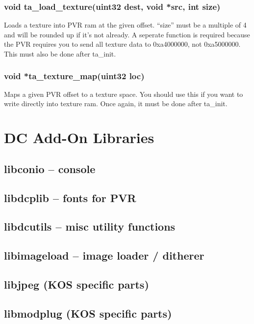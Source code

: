 \documentclass[english]{report}
\begin{document}
\subsection{void ta\_load\_texture(uint32 dest, void *src, int size)}

Loads a texture into PVR ram at the given offset. ``size'' must
be a multiple of 4 and will be rounded up if it's not already. A seperate
function is required because the PVR requires you to send all texture
data to 0xa4000000, not 0xa5000000. This must also be done after ta\_init.


\subsection{void *ta\_texture\_map(uint32 loc)}

Maps a given PVR offset to a texture space. You should use this if
you want to write directly into texture ram. Once again, it must be
done after ta\_init.


\chapter{DC Add-On Libraries}


\section{libconio -- console}


\section{libdcplib -- fonts for PVR}


\section{libdcutils -- misc utility functions}


\section{libimageload -- image loader / ditherer}


\section{libjpeg (KOS specific parts)}


\section{libmodplug (KOS specific parts)}
\end{document}

